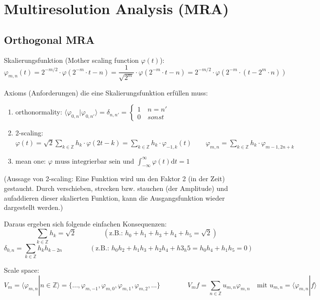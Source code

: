 \section{Multiresolution Analysis (MRA)}

\subsection{Orthogonal MRA}
Skalierungsfunktion (Mother scaling function $\varphi(t)$): 
\[
	\varphi_{m,n}(t)=2^{-m/2} \cdot \varphi(2^{-m}\cdot t - n) = \frac{1}{\sqrt{2^{m}}} \cdot \varphi(2^{-m}\cdot t -n) = 2^{-m/2} \cdot \varphi(2^{-m}\cdot (t - 2^{m}\cdot n))
\]

Axioms (Anforderungen) die eine Skalierungsfunktion erfüllen muss:
\begin{enumerate}
	\item orthonormality: $ \langle \varphi_{0,n}|\varphi_{0,n'} \rangle = \delta_{n,n'} =  \begin{cases} 1 \quad n=n'\\ 0 \quad sonst  \end{cases}  $
	\item 2-scaling: $ \varphi(t) = \sqrt{2} \sum_{k \in \mathbb{Z}} h_k \cdot \varphi(2t-k) = \sum_{k \in \mathbb{Z}} h_k \cdot \varphi_{-1,k}(t) \qquad \varphi_{m,n}=\sum_{k \in \mathbb{Z}} h_k \cdot \varphi_{m-1,2n+k} $
	\item mean one: $ \varphi \text{ muss integrierbar sein und } \int_{-\infty}^{\infty}\varphi(t) \mathrm{d}t = 1 $
\end{enumerate}

(Aussage von 2-scaling: Eine Funktion wird um den Faktor 2 (in der Zeit) gestaucht. Durch verschieben, strecken bzw. stauchen (der Amplitude) und aufaddieren dieser skalierten Funktion, kann die  Ausgangsfunktion wieder dargestellt werden.)

Daraus ergeben sich folgende einfachen Konsequenzen:
\[ 
	\sum_{k \in \mathbb{Z}} h_k = \sqrt{2} \qquad \qquad (\text{z.B.: } h_0 + h_1 + h_3 + h_4 + h_5 = \sqrt{2})
\]
\[
	\delta_{0,n} = \sum_{k \in \mathbb{Z}} h_k h_{k-2n} \qquad \qquad (\text{z.B.: } h_0h_2 + h_1h_3 + h_2h_4 + h3_h5 = h_0h_4+h_1h_5 = 0 )
\]

Scale space: 
\[
	V_m = \langle \varphi_{m,n}|n \in \mathbb{Z}  \rangle = \{ ...,\varphi_{m,-1},\varphi_{m,0}, \varphi_{m,1}, \varphi_{m,2},... \}
	\qquad \qquad
	V_mf = \sum_{n \in \mathbb{Z}} u_{m,n}\varphi_{m,n} \quad \text{mit } u_{m,n}=\langle \varphi_{m,n}|f \rangle
\]

